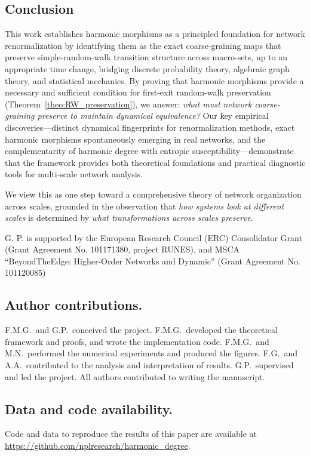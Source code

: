 \documentclass[twocolumn,superscriptaddress,tightenlines,aps,prx,floatfix]{revtex4-2}
\begin{document}
\begin{bibunit}
\subsection{Conclusion}

This work establishes harmonic morphisms as a principled foundation for network renormalization by identifying them as the exact coarse-graining maps that preserve simple-random-walk transition structure across macro-sets, up to an appropriate time change, bridging discrete probability theory, algebraic graph theory, and statistical mechanics. 
By proving that harmonic morphisms provide a necessary and sufficient condition for first-exit random-walk preservation (Theorem~\ref{theo:RW_preservation}), we answer: \textit{what must network coarse-graining preserve to maintain dynamical equivalence?}
Our key empirical discoveries---distinct dynamical fingerprints for renormalization methods, exact harmonic morphisms spontaneously emerging in real networks, and the complementarity of harmonic degree with entropic susceptibility---demonstrate that the framework provides both theoretical foundations and practical diagnostic tools for multi-scale network analysis.

We view this as one step toward a comprehensive theory of network organization across scales, grounded in the observation that \emph{how systems look at different scales} is determined by \emph{what transformations across scales preserve}.

\begin{acknowledgments}
G. P. is supported by the European Research Council (ERC) Consolidator Grant (Grant Agreement No. 101171380, project RUNES), and MSCA  ``BeyondTheEdge: Higher-Order Networks and Dynamic'' (Grant Agreement No. 101120085) 
\end{acknowledgments}

\subsection*{Author contributions.}

F.M.G.\ and G.P.\ conceived the project. F.M.G.\ developed the theoretical framework and proofs, and wrote the implementation code. F.M.G.\ and M.N.\ performed the numerical experiments and produced the figures. F.G.\ and A.A.\ contributed to the analysis and interpretation of results. G.P.\ supervised and led the project. All authors contributed to writing the manuscript.

\subsection*{Data and code availability.}
Code and data to reproduce the results of this paper are available at \url{https://github.com/nplresearch/harmonic_degree}.

\putbib[biblio]
\end{bibunit}
\end{document}
